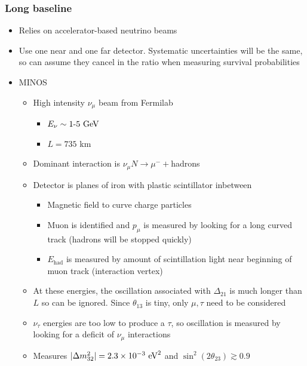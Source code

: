 \subsubsection{Long baseline}
\begin{itemize}
  \item Relies on accelerator-based neutrino beams
  \item Use one near and one far detector. Systematic uncertainties will be the same, so can assume they cancel in the ratio when measuring survival probabilities
  \item MINOS
  \begin{itemize}
    \item High intensity $\nu_\mu$ beam from Fermilab
    \begin{itemize}
      \item $E_\nu \sim 1\text{-}5~\text{GeV}$
      \item $L=735$ km
    \end{itemize}
    \item Dominant interaction is $\nu_\mu N\rightarrow\mu^-+$hadrons
    \item Detector is planes of iron with plastic scintillator inbetween
    \begin{itemize}
      \item Magnetic field to curve charge particles
      \item Muon is identified and $p_\mu$ is measured by looking for a long curved track (hadrons will be stopped quickly)
      \item $E_\text{had}$ is measured by amount of scintillation light near beginning of muon track (interaction vertex)
    \end{itemize}
    \item At these energies, the oscillation associated with $\Delta_{21}$ is much longer than $L$ so can be ignored. Since $\theta_{13}$ is tiny, only $\mu,\tau$ need to be considered
    \item $\nu_\tau$ energies are too low to produce a $\tau$, so oscillation is measured by looking for a deficit of $\nu_\mu$ interactions
    \item Measures $|\Delta m_{32}^2| = 2.3 \times 10^{-3}~\text{eV}^2$ and $\sin^2(2\theta_{23})\gtrsim 0.9$
  \end{itemize}
\end{itemize}

